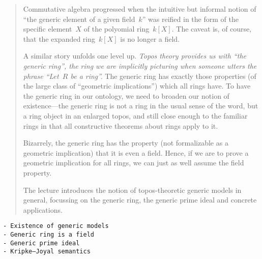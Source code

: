 \documentclass[10pt,reqno,a4paper,openany]{amsbook}
\theoremstyle{definition}
\theoremstyle{plain}
\theoremstyle{remark}
\newcommand{\?}{\,{:}\,}
\renewcommand{\_}{\mathpunct{.}\,}
\newenvironment{intro}{\begin{quote}}{\end{quote}\bigskip}
\begin{document}
\begin{intro}
Commutative algebra progressed when the intuitive but informal notion of
``the generic element of a given field~$k$'' was reified in the form of the
specific element~$X$ of the polyomial ring~$k[X]$. The caveat is, of course,
that the expanded ring~$k[X]$ is no longer a field.

A similar story unfolds one level up. \emph{Topos theory provides us with ``the
generic ring'', the ring we are implicitly picturing when someone utters
the phrase ``Let~$R$ be a ring''.} The generic ring has exactly those
properties (of the large class of ``geometric implications'') which all rings
have. To have the generic ring in our ontology,
we need to broaden our notion of existence---the generic ring is not a
ring in the usual sense of the word, but a ring object in an enlarged
topos, and still close enough to the familiar rings in that all
constructive theorems about rings apply to it.

Bizarrely, the generic ring has the property (not formalizable as a
geometric implication) that it is even a field. Hence, if we are to
prove a geometric implication for all rings, we can just as well assume
the field property.

The lecture introduces the notion of topos-theoretic generic models in
general, focussing on the generic ring, the generic prime ideal and
concrete applications.
\end{intro}

\vfill{\small%
\begin{verbatim}
- Existence of generic models
- Generic ring is a field
- Generic prime ideal
- Kripke–Joyal semantics
\end{verbatim}
}

\printbibliography
\end{document}
